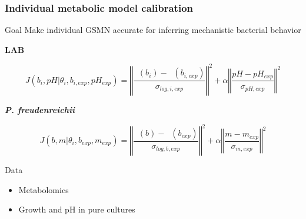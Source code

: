 \documentclass[8pt]{beamer}
\DeclareMathOperator*{\logten}{log_{10}}
\begin{document}
\begin{frame}
\frametitle{Individual metabolic model calibration}

\begin{exampleblock}{Goal}
Make individual GSMN accurate for inferring mechanistic bacterial behavior
\end{exampleblock}

\textbf{LAB} 

\begin{equation}
J(b_i,pH | \theta_i, b_{i,exp},pH_{exp} ) = \left \Vert \frac{\logten(b_i) - \logten(b_{i,exp})}{\sigma_{log,i,exp}} \right \Vert^2 + \alpha \left \Vert\frac{pH - pH_{exp}}{\sigma_{pH,exp}} \right \Vert^2 
\label{eq:optim_LAB}
\end{equation}

\textbf{\textit{P. freudenreichii}}

\begin{equation} 
J(b,m | \theta_i, b_{exp},m_{exp} ) = \left \Vert \frac{\logten(b) - \logten(b_{exp})}{\sigma_{log,b,exp}} \right \Vert ^2 + \alpha \left \Vert \frac{m - m_{exp}}{\sigma_{m,exp}} \right \Vert^2 
\label{eq:optim_freud}
\end{equation}

\begin{block}{Data}
\begin{itemize}
\item Metabolomics
\item Growth and pH in pure cultures
\end{itemize}
\end{block}

\end{frame}
\end{document}
